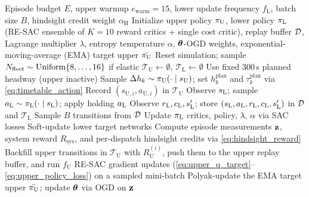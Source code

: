 \begin{algorithm}[t]
\caption{TransitDuet training procedure}
\label{alg:training}
\begin{algorithmic}[1]
\REQUIRE Episode budget $E$, upper warmup $e_{\mathrm{warm}} = 15$, lower update frequency $f_{\mathrm{L}}$, batch size $B$, hindsight credit weight $\alpha_{\mathrm{H}}$
    \STATE Initialize upper policy $\pi_{\mathrm{U}}$, lower policy $\pi_{\mathrm{L}}$ (RE-SAC ensemble of $K{=}10$ reward critics + single cost critic), replay buffer $\mathcal{D}$, Lagrange multiplier $\lambda$, entropy temperature $\alpha$, $\boldsymbol{\theta}$-OGD weights, exponential-moving-average (EMA) target upper $\bar{\pi_{\mathrm{U}}}$
    \STATE Reset simulation; sample $N_{\mathrm{fleet}} \sim \mathrm{Uniform}\{8, \ldots, 16\}$ if elastic
    \STATE $\mathcal{T}_{\mathrm{U}} \leftarrow \emptyset$, $\mathcal{T}_{\mathrm{L}} \leftarrow \emptyset$
                \STATE Use fixed $300$\,s planned headway (upper inactive)
            \ELSE
                \STATE Sample $\Delta h_k \sim \pi_{\mathrm{U}}(\cdot\mid s_{\mathrm{U}})$; set $h^{\mathrm{plan}}_k$ and $\tau^{\mathrm{plan}}_k$ via \cref{eq:timetable_action}
                \STATE Record $(s_{\mathrm{U},i}, a_{\mathrm{U},i})$ in $\mathcal{T}_{\mathrm{U}}$
            \ENDIF
        \ENDIF
            \STATE Observe $s_{\mathrm{L}}$; sample $a_{\mathrm{L}} \sim \pi_{\mathrm{L}}(\cdot \mid s_{\mathrm{L}})$; apply holding $a_{\mathrm{L}}$
            \STATE Observe $r_{\mathrm{L}}, c_{\mathrm{L}}, s_{\mathrm{L}}'$; store $(s_{\mathrm{L}}, a_{\mathrm{L}}, r_{\mathrm{L}}, c_{\mathrm{L}}, s_{\mathrm{L}}')$ in $\mathcal{D}$ and $\mathcal{T}_{\mathrm{L}}$
                \STATE Sample $B$ transitions from $\mathcal{D}$
                \STATE Update $\pi_{\mathrm{L}}$ critics, policy, $\lambda$, $\alpha$ via SAC losses
                \STATE Soft-update lower target networks
            \ENDIF
        \ENDIF
    \ENDWHILE
    \STATE Compute episode measurements $\mathbf{z}$, system reward $R_{\mathrm{sys}}$, and per-dispatch hindsight credits via \cref{eq:hindsight_reward}
    \STATE Backfill upper transitions in $\mathcal{T}_{\mathrm{U}}$ with $R_{\mathrm{U}}^{(i)}$, push them to the upper replay buffer, and run $f_{\mathrm{U}}$ RE-SAC gradient updates (\cref{eq:upper_q_target}--\ref{eq:upper_policy_loss}) on a sampled mini-batch
    \STATE Polyak-update the EMA target upper $\bar{\pi_{\mathrm{U}}}$; update $\boldsymbol{\theta}$ via OGD on $\mathbf{z}$
\ENDFOR
\end{algorithmic}
\end{algorithm}

